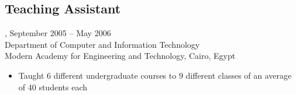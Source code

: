 \subsection{Teaching Assistant}, September 2005 -- May 2006\\
Department of Computer and Information Technology\\
Modern Academy for Engineering and Technology, Cairo, Egypt
\begin{itemize}
\item Taught 6 different undergraduate courses to 9 different classes of an average of 40 students each
\end{itemize}